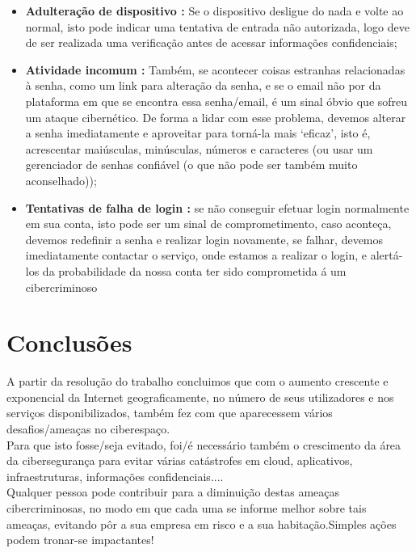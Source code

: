 \documentclass{report}
\begin{document}
{\begin{itemize}
    \item   \textbf{Adulteração de dispositivo : } Se o dispositivo desligue do nada e volte ao normal, isto pode indicar uma tentativa de entrada não autorizada, logo deve de ser realizada uma verificação antes de acessar informações confidenciais;
    
    \item   \textbf{Atividade incomum : } Também, se acontecer coisas estranhas relacionadas à senha, como um link para alteração da senha, e se o email não por da plataforma em que se encontra essa senha/email, é um sinal óbvio que sofreu um ataque cibernético. De forma a lidar com esse problema, devemos alterar a senha imediatamente e aproveitar para torná-la mais ‘eficaz’, isto é, acrescentar maiúsculas, minúsculas, números e caracteres (ou usar um gerenciador de senhas confiável (o que não pode ser também muito aconselhado));
    
    \item   \textbf{Tentativas de falha de login : } se não conseguir efetuar login normalmente em sua conta, isto pode ser um sinal de comprometimento, caso aconteça, devemos redefinir a senha e realizar login novamente, se falhar, devemos imediatamente contactar o serviço, onde estamos a realizar o login, e alertá-los da probabilidade da nossa conta ter sido comprometida á um cibercriminoso
	\end{itemize}
\chapter{Conclusões}
\label{chap.conclusao}
A partir da resolução do trabalho concluimos que com o aumento crescente e exponencial da Internet geograficamente, no número de seus utilizadores e nos serviços disponibilizados, também fez com que aparecessem vários desafios/ameaças no ciberespaço.\\ Para que isto fosse/seja evitado, foi/é necessário também o crescimento da área da cibersegurança para evitar várias catástrofes em cloud, aplicativos, infraestruturas, informações confidenciais....\\ Qualquer pessoa pode contribuir para a diminuição destas ameaças cibercriminosas, no modo em que cada uma se informe melhor sobre tais ameaças, evitando pôr a sua empresa em risco e a sua habitação.Simples ações podem tronar-se impactantes!

}
\end{document}
